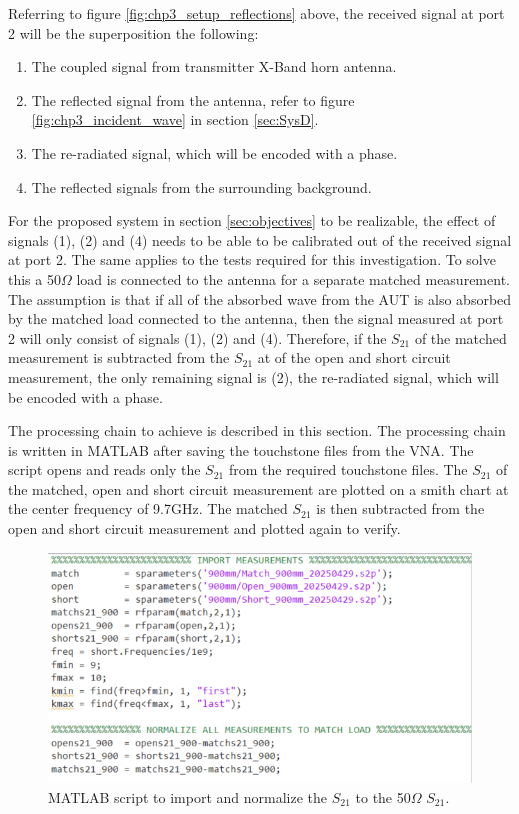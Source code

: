 Referring to figure \ref{fig:chp3_setup_reflections} above, the received signal at port 2 will be the superposition the following:
\begin{enumerate}
    \item The coupled signal from transmitter X-Band horn antenna.
    \item The reflected signal from the antenna, refer to figure \ref{fig:chp3_incident_wave} in section \ref{sec:SysD}.
    \item The re-radiated signal, which will be encoded with a phase.
    \item The reflected signals from the surrounding background.
\end{enumerate}

For the proposed system in section \ref{sec:objectives} to be realizable, the effect of signals (1), (2) and (4) needs to be able to be calibrated out of the received signal at port 2. The same applies to the tests required for this investigation. To solve this a 50$\Omega$ load is connected to the antenna for a separate matched measurement. The assumption is that if all of the absorbed wave from the AUT is also absorbed by the matched load connected to the antenna, then the signal measured at port 2 will only consist of signals (1), (2) and (4). Therefore, if the \(S_{21}\) of the matched measurement is subtracted from the \(S_{21}\) at of the open and short circuit measurement, the only remaining signal is (2), the re-radiated signal, which will be encoded with a phase.

The processing chain to achieve is described in this section. The processing chain is written in MATLAB after saving the touchstone files from the VNA. The script opens and reads only the \(S_{21}\) from the required touchstone files. The \(S_{21}\) of the matched, open and short circuit measurement are plotted on a smith chart at the center frequency of 9.7GHz. The matched \(S_{21}\) is then subtracted from the open and short circuit measurement and plotted again to verify.

    \begin{figure}[H]
    \centering
    \includegraphics[width=0.6\linewidth]{Figures/chp3_code_import_norm.png}
    \caption{MATLAB script to import and normalize the \(S_{21}\) to the 50$\Omega$ \(S_{21}\).}
    \label{fig:chp3_code_import_norm}
    \end{figure}


